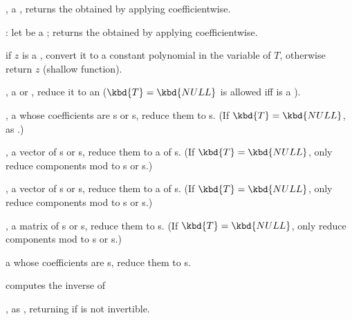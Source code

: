 ,  a , returns the
 obtained by applying  coefficientwise.

: let  be a ;
returns the  obtained by applying  coefficientwise.

if $z$ is a , convert it to a constant polynomial in the variable of
$T$, otherwise return $z$ (shallow function).

,  a  or ,
reduce it to an  ($\kbd{T} = \kbd{NULL}$ is allowed iff  is a
).

,  a 
whose coefficients are s or s, reduce them to s. (If
$\kbd{T} = \kbd{NULL}$, as .)

,  a vector of s or
s, reduce them to a  of s. (If $\kbd{T} = \kbd{NULL}$, only
reduce components mod  to s or s.)

,  a vector of s or
s, reduce them to a  of s. (If $\kbd{T} = \kbd{NULL}$, only
reduce components mod  to s or s.)

,  a matrix of s or
s, reduce them to s. (If $\kbd{T} = \kbd{NULL}$, only
reduce components mod  to s or s.)

  a 
whose coefficients are s, reduce them to s.







 computes the inverse of 

, as , returning
 if  is not invertible.

